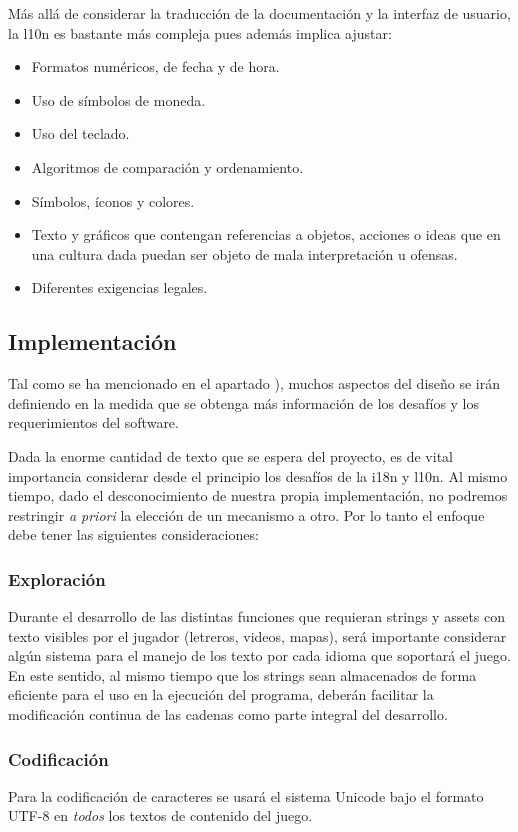 Más allá de considerar la traducción de la documentación y la interfaz de usuario, la l10n es bastante más compleja pues además implica ajustar:
\begin{itemize}
	\item Formatos numéricos, de fecha y de hora.
	\item Uso de símbolos de moneda.
	\item Uso del teclado.
	\item Algoritmos de comparación y ordenamiento.
	\item Símbolos, íconos y colores.
	\item Texto y gráficos que contengan referencias a objetos, acciones o ideas que en una cultura dada puedan ser objeto de mala interpretación u ofensas.
	\item Diferentes exigencias legales.
\end{itemize}

\subsection{Implementación}\label{i18n:implementacion}
Tal como se ha mencionado en el apartado ), muchos aspectos del diseño se irán definiendo en la medida que se obtenga más información de los desafíos y los requerimientos del software.

Dada la enorme cantidad de texto que se espera del proyecto, es de vital importancia considerar desde el principio los desafíos de la i18n y l10n.
Al mismo tiempo, dado el desconocimiento de nuestra propia implementación, no podremos restringir \textit{a priori} la elección de un mecanismo a otro. Por lo tanto el enfoque debe tener las siguientes consideraciones:

\subsubsection{Exploración}\label{i18n:exploracion}
Durante el desarrollo de las distintas funciones que requieran strings y assets con texto visibles por el jugador (letreros, videos, mapas), será importante considerar algún sistema para el manejo de los texto por cada idioma que soportará el juego.
En este sentido, al mismo tiempo que los strings sean almacenados de forma eficiente para el uso en la ejecución del programa, deberán facilitar la modificación continua de las cadenas como parte integral del desarrollo.

\subsubsection{Codificación}\label{i18n:codificacion}
Para la codificación de caracteres se usará el sistema Unicode bajo el formato UTF-8 en \emph{todos} los textos de contenido del juego.

